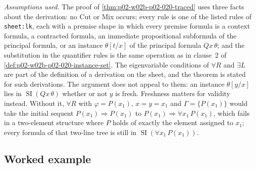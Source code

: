 \emph{Assumptions used.}  The proof of
\cref{thm:p02-w02b-p02-020-traced} uses three facts about the derivation: no
Cut or Mix occurs; every rule is one of the listed rules of
\texttt{sheet:lk}, each with a premise shape in which every
premise formula is a context formula, a contracted formula, an immediate
propositional subformula of the principal formula, or an instance
\(\theta[t/x]\) of the principal formula \(Qx\,\theta\); and the substitution in
the quantifier rules is the same operation as in clause~2 of
\cref{def:p02-w02b-p02-020-instance-set}.  The eigenvariable conditions of
\(\forall R\) and \(\exists L\) are part of the definition of a derivation on
the sheet, and the theorem is stated for such derivations.  The argument does
not appeal to them: an instance \(\theta[y/x]\) lies in
\(\operatorname{SI}(Qx\,\theta)\) whether or not \(y\) is fresh.  Freshness
matters for validity instead.  Without it, \(\forall R\) with
\(\varphi=P(x_1)\), \(x=y=x_1\) and \(\Gamma=\{P(x_1)\}\) would take the
initial sequent \(P(x_1)\Rightarrow P(x_1)\) to
\(P(x_1)\Rightarrow\forall x_1\,P(x_1)\), which fails in a two-element
structure where \(P\) holds of exactly the element assigned to \(x_1\); every
formula of that two-line tree is still in
\(\operatorname{SI}(\forall x_1\,P(x_1))\).

\subsection{Worked example}
\label{sec:p02-w02b-p02-020-example}

